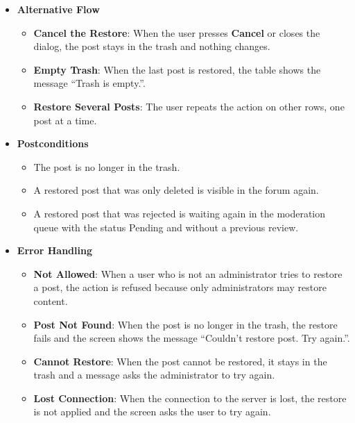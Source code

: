 \begin{itemize}[leftmargin=1.6em,topsep=4pt,itemsep=3pt,parsep=0pt,label=$\bullet$]
\begin{itemize}[leftmargin=2.2em,topsep=2pt,itemsep=3pt,parsep=0pt,label=$\circ$]
\begin{itemize}[leftmargin=2.2em,topsep=2pt,itemsep=3pt,parsep=0pt,label=$\blacksquare$]
                \end{itemize}
            \item \textbf{Update the Trash}: The restored post disappears from the trash list and the remaining rows move up.
        \end{itemize}
    \item \textbf{Alternative Flow}
        \begin{itemize}[leftmargin=2.2em,topsep=2pt,itemsep=3pt,parsep=0pt,label=$\circ$]
            \item \textbf{Cancel the Restore}: When the user presses \textbf{Cancel} or closes the dialog, the post stays in the trash and nothing changes.
            \item \textbf{Empty Trash}: When the last post is restored, the table shows the message ``Trash is empty.''.
            \item \textbf{Restore Several Posts}: The user repeats the action on other rows, one post at a time.
        \end{itemize}
    \item \textbf{Postconditions}
        \begin{itemize}[leftmargin=2.2em,topsep=2pt,itemsep=3pt,parsep=0pt,label=$\circ$]
            \item The post is no longer in the trash.
            \item A restored post that was only deleted is visible in the forum again.
            \item A restored post that was rejected is waiting again in the moderation queue with the status Pending and without a previous review.
        \end{itemize}
    \item \textbf{Error Handling}
        \begin{itemize}[leftmargin=2.2em,topsep=2pt,itemsep=3pt,parsep=0pt,label=$\circ$]
            \item \textbf{Not Allowed}: When a user who is not an administrator tries to restore a post, the action is refused because only administrators may restore content.
            \item \textbf{Post Not Found}: When the post is no longer in the trash, the restore fails and the screen shows the message ``Couldn't restore post. Try again.''.
            \item \textbf{Cannot Restore}: When the post cannot be restored, it stays in the trash and a message asks the administrator to try again.
            \item \textbf{Lost Connection}: When the connection to the server is lost, the restore is not applied and the screen asks the user to try again.

\end{itemize}
\end{itemize}
